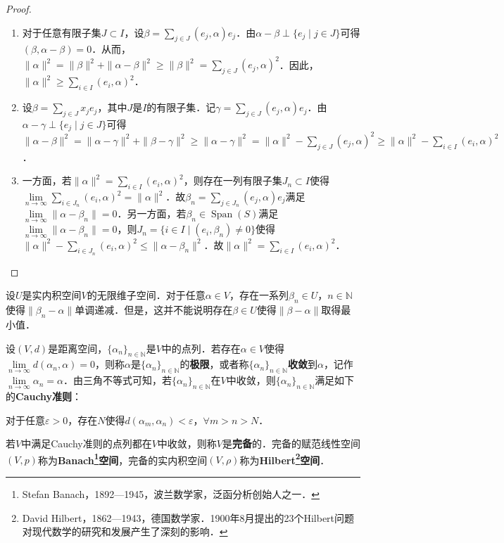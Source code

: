 \documentclass[a4paper,fontset=windows]{ctexbook}
\theoremstyle{definition}
\DeclareMathOperator{\Span}{Span}
\def\note{\noindent\raisebox{10pt}{\dbend}\hspace{7pt}}
\renewcommand{\le}{\leqslant}
\renewcommand{\ge}{\geqslant}
\begin{document}
\begin{proof}~
\begin{enumerate}
\item 对于任意有限子集$J\subset I$，设$\beta=\sum\limits_{j\in J}(e_j,\alpha)e_j$．由$\alpha-\beta\perp\{e_j\mid j\in J\}$可得$(\beta,\alpha-\beta)=0$．从而，$\|\alpha\|^2=\|\beta\|^2+\|\alpha-\beta\|^2\ge\|\beta\|^2=\sum\limits_{j\in J}(e_j,\alpha)^2$．因此，$\|\alpha\|^2\ge\sum\limits_{i\in I}(e_i,\alpha)^2$．

\item 设$\beta=\sum\limits_{j\in J}x_je_j$，其中$J$是$I$的有限子集．记$\gamma=\sum\limits_{j\in J}(e_j,\alpha)e_j$．由$\alpha-\gamma\perp\{e_j\mid j\in J\}$可得$\|\alpha-\beta\|^2=\|\alpha-\gamma\|^2+\|\beta-\gamma\|^2\ge\|\alpha-\gamma\|^2=\|\alpha\|^2-\sum\limits_{j\in J}(e_j,\alpha)^2\ge\|\alpha\|^2-\sum\limits_{i\in I}(e_i,\alpha)^2$．

\item 一方面，若$\|\alpha\|^2=\sum\limits_{i\in I}(e_i,\alpha)^2$，则存在一列有限子集$J_n\subset I$使得$\lim\limits_{n\to\infty}\sum\limits_{i\in J_n}(e_i,\alpha)^2=\|\alpha\|^2$．故$\beta_n=\sum\limits_{j\in J_n}(e_j,\alpha)e_j$满足$\lim\limits_{n\to\infty}\|\alpha-\beta_n\|=0$．另一方面，若$\beta_n\in\Span(S)$满足$\lim\limits_{n\to\infty}\|\alpha-\beta_n\|=0$，则$J_n=\{i\in I\mid(e_i,\beta_n)\ne 0\}$使得$\|\alpha\|^2-\sum\limits_{i\in J_n}(e_i,\alpha)^2\le\|\alpha-\beta_n\|^2$．故$\|\alpha\|^2=\sum\limits_{i\in I}(e_i,\alpha)^2$．\qedhere
\end{enumerate}
\end{proof}

\note 设$U$是实内积空间$V$的无限维子空间．对于任意$\alpha\in V$，存在一系列$\beta_n\in U$，$n\in\mathbb{N}$使得$\|\beta_n-\alpha\|$单调递减．但是，这并不能说明存在$\beta\in U$使得$\|\beta-\alpha\|$取得最小值．

\medskip 设$(V,d)$是距离空间，$\{\alpha_n\}_{n\in\mathbb{N}}$是$V$中的点列．若存在$\alpha\in V$使得$\lim\limits_{n\to\infty}d(\alpha_n,\alpha)=0$，则称$\alpha$是$\{\alpha_n\}_{n\in\mathbb{N}}$的{\bf 极限}，或者称$\{\alpha_n\}_{n\in\mathbb{N}}${\bf 收敛}到$\alpha$，记作$\lim\limits_{n\to\infty}\alpha_n=\alpha$．由三角不等式可知，若$\{\alpha_n\}_{n\in\mathbb{N}}$在$V$中收敛，则$\{\alpha_n\}_{n\in\mathbb{N}}$满足如下的{\bf Cauchy准则}：
\begin{center}
对于任意$\varepsilon>0$，存在$N$使得$d(\alpha_m,\alpha_n)<\varepsilon$，$\forall m>n>N$．
\end{center}
若$V$中满足Cauchy准则的点列都在$V$中收敛，则称$V$是{\bf 完备}的．完备的赋范线性空间$(V,p)$称为{\bf Banach\footnote{Stefan Banach，1892—1945，波兰数学家，泛函分析创始人之一．}空间}，完备的实内积空间$(V,\rho)$称为{\bf Hilbert\footnote{David Hilbert，1862—1943，德国数学家．1900年8月提出的23个Hilbert问题对现代数学的研究和发展产生了深刻的影响．}空间}．
\end{document}
